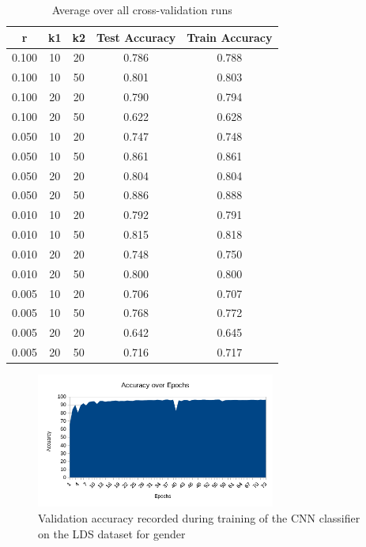 \begin{table}[h]
  \caption{Average over all cross-validation runs}
  \label{tbl:cnnCrossVal}
  \begin{center}
    \begin{tabular}{|c|c|c|c|c|}
      \hline
        r   &   k1 & k2 & Test Accuracy   & Train Accuracy  \\
      \hline
      0.100 &   10 & 20 &      0.786      &      0.788      \\  
      0.100 &   10 & 50 &      0.801      &      0.803      \\  
      0.100 &   20 & 20 &      0.790      &      0.794      \\  
      0.100 &   20 & 50 &      0.622      &      0.628      \\  
      0.050 &   10 & 20 &      0.747      &      0.748      \\  
      0.050 &   10 & 50 &      0.861      &      0.861      \\  
      0.050 &   20 & 20 &      0.804      &      0.804      \\  
      0.050 &   20 & 50 &      0.886      &      0.888      \\  
      0.010 &   10 & 20 &      0.792      &      0.791      \\  
      0.010 &   10 & 50 &      0.815      &      0.818      \\  
      0.010 &   20 & 20 &      0.748      &      0.750      \\  
      0.010 &   20 & 50 &      0.800      &      0.800      \\  
      0.005 &   10 & 20 &      0.706      &      0.707      \\  
      0.005 &   10 & 50 &      0.768      &      0.772      \\  
      0.005 &   20 & 20 &      0.642      &      0.645      \\  
      0.005 &   20 & 50 &      0.716      &      0.717      \\  
      \hline
    \end{tabular}
  \end{center}
\end{table}

\begin{figure}[ht]
  \centering
  \includegraphics[width=0.7\textwidth]{images/AccuracyoverEpochslog7.png}
  \caption{
    Validation accuracy recorded during training of the CNN classifier on the
    LDS dataset for gender
    }
  \label{fig:valAccuracyDuringTraining}
\end{figure}




